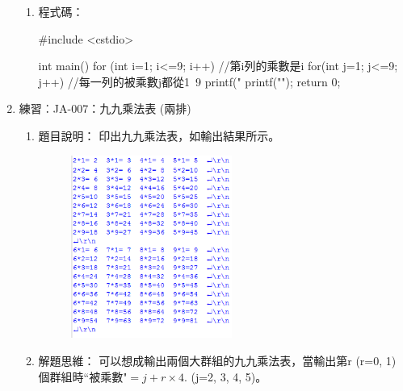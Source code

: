 \begin{enumerate}
\begin{enumerate}
			\item 程式碼：
			\begin{cppcode}
			#include <cstdio>
			
			int main()
			{
				for (int i=1; i<=9; i++) {//第i列的乘數是i
					for(int j=1; j<=9; j++) {//每一列的被乘數j都從1~9
						printf("%
					}
					printf("\n");
				}
				return 0;
			}
				
			\end{cppcode}
		\end{enumerate}
	
	\item 練習︰JA-007：九九乘法表 (兩排)
		\begin{enumerate}
			\item 題目說明：
			\subitem 印出九九乘法表，如輸出結果所示。
			\begin{figure}[h]
				\centering
				\includegraphics[height=6cm]{fig/JA007fig}
			\end{figure}
			\item 解題思維：
			\subitem 可以想成輸出兩個大群組的九九乘法表，當輸出第r (r=0, 1) 個群組時``被乘數"$=j+r\times4.$ (j=2, 3, 4, 5)。

		\end{enumerate}
	
\end{enumerate}
